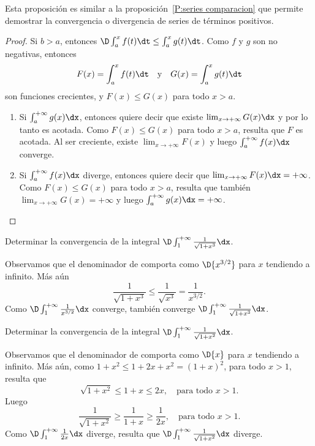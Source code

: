Esta proposición es similar a la proposición~\ref{P:series comparacion} que permite demostrar la convergencia o divergencia de series de términos positivos.

\begin{proof}
  Si $b>a$, entonces $\D\int_a^{x} f(t) \dt\le \int_a^{x} g(t) \dt$.
  Como $f$ y $g$ son no negativas, entonces 
  \[
  F(x) = \int_a^x f(t)\dt
  \quad\text{y}\quad
  G(x) = \int_a^x g(t)\dt
  \]
  son funciones crecientes, y $F(x)\le G(x)$ para todo $x>a$.

  \begin{enumerate}
    \item Si $\int_a^{+\infty} g(x) \dx$, entonces quiere decir que existe $\lim_{x\to+\infty}G(x)\dx$ y por lo tanto es acotada. Como $F(x)\le G(x)$ para todo $x>a$, resulta que $F$ es acotada. Al ser creciente, existe 
    $\lim_{x\to+\infty} F(x)$ y luego $\int_a^{+\infty} f(x) \dx$ converge.

    \item Si $\int_a^{+\infty} f(x) \dx$ diverge, entonces quiere decir que $\lim_{x\to+\infty}F(x)\dx=+\infty$. Como $F(x)\le G(x)$ para todo $x>a$, resulta que también $\lim_{x\to+\infty} G(x)=+\infty$ y luego $\int_a^{+\infty} g(x) \dx=+\infty$.
    \qedhere
  \end{enumerate}
\end{proof}

\begin{example}
  Determinar la convergencia de la integral $\D \int_1^{+\infty} \frac{1}{\sqrt{1+x^3}}\dx$.

  Observamos que el denominador de comporta como $\D {x^{3/2}}$ para $x$ tendiendo a infinito. Más aún
  \[
  \frac{1}{\sqrt{1+x^3}}
  \le 
  \frac{1}{\sqrt{x^3}}
  =
  \frac{1}{x^{3/2}}.
  \]
  Como $\D\int_1^{+\infty }\frac{1}{x^{3/2}}\dx$ converge, también converge $\D \int_1^{+\infty} \frac{1}{\sqrt{1+x^3}}\dx$.
\end{example}

\begin{example}
  Determinar la convergencia de la integral $\D \int_1^{+\infty} \frac{1}{\sqrt{1+x^2}}\dx$.
  
  Observamos que el denominador de comporta como $\D{x}$ para $x$ tendiendo a infinito. 
  Más aún, como $1+x^2 \le 1+2x+x^2=(1+x)^2$, para todo $x>1$, resulta que
  \[
  \sqrt{1+x^2} \le 1+x \le 2x, \quad \text{para todo $x>1$.}
  \]
  Luego
  \[
  \frac{1}{\sqrt{1+x^2}} \ge \frac1{1+x} \ge \frac1{2x}, \quad \text{para todo $x>1$.}
  \]
  Como $\D\int_1^{+\infty} \frac1{2x}\dx$ diverge, resulta que $\D \int_1^{+\infty} \frac{1}{\sqrt{1+x^2}}\dx$ diverge.
\end{example}

